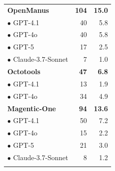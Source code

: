 \begin{table}[ht]
{\begin{tabular}{lrr}
            \hspace{0.3cm} \textbf{OpenManus} &  \textbf{104} & \textbf{15.0} \\ 
                \hspace{0.6cm} \hspace{0.3cm} $\bullet$ GPT-4.1 & 40 & 5.8 \\ 
                \hspace{0.6cm} \hspace{0.3cm} $\bullet$ GPT-4o &  40 & 5.8 \\ 
                \hspace{0.6cm} \hspace{0.3cm} $\bullet$ GPT-5 &  17 & 2.5 \\ 
                \hspace{0.6cm} \hspace{0.3cm} $\bullet$ Claude-3.7-Sonnet &  7 & 1.0 \\ 
             \rowcolor{COLOR_MEAN} 
            \hspace{0.3cm} \textbf{Octotools} &  \textbf{47} & \textbf{6.8} \\ 
                \hspace{0.6cm} \hspace{0.3cm} $\bullet$ GPT-4.1 &  13 & 1.9 \\ 
                \hspace{0.6cm} \hspace{0.3cm} $\bullet$ GPT-4o &  34 & 4.9 \\ 
            \rowcolor{COLOR_MEAN} 
            \hspace{0.3cm} \textbf{Magentic-One} &  \textbf{94} & \textbf{13.6} \\ 
                \hspace{0.6cm} \hspace{0.3cm} $\bullet$ GPT-4.1 & 50 & 7.2 \\ 
                \hspace{0.6cm} \hspace{0.3cm} $\bullet$ GPT-4o &  15 & 2.2 \\ 
                \hspace{0.6cm} \hspace{0.3cm} $\bullet$ GPT-5 &  21 & 3.0 \\ 
                \hspace{0.6cm} \hspace{0.3cm} $\bullet$ Claude-3.7-Sonnet &  8 & 1.2 \\ 
            \rowcolor{COLOR_MEAN} 

\end{tabular}}
\end{table}
